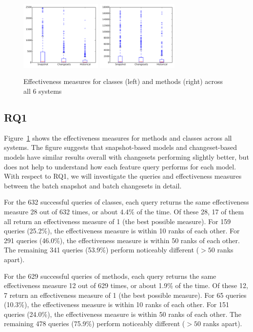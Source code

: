 \begin{figure}[t]
\centering
\includegraphics[width=0.36\textwidth]{figures/rq2-overall-class}
\includegraphics[width=0.36\textwidth]{figures/rq2-overall-method}
\caption{Effectiveness measures for classes (left) and methods (right) across all 6 systems}
\label{fig:em}
\end{figure}

\subsection{RQ1}

Figure~\ref{fig:em} shows the effectiveness measures for methods and classes
across all systems. The figure suggests that snapshot-based models and
changeset-based models have similar results overall with changesets performing
slightly better, but does not help to understand how each feature query performs
for each model.  With respect to RQ1, we will investigate the queries and
effectiveness measures between the batch snapshot and batch changesets in
detail.

For the 632 successful queries of classes, each query returns the same
effectiveness measure 28 out of 632 times, or about 4.4\% of the time.  Of these
28, 17 of them all return an effectiveness measure of 1 (the best possible
measure).  For 159 queries (25.2\%), the effectiveness measure is within 10
ranks of each other.  For 291 queries (46.0\%), the effectiveness measure is
within 50 ranks of each other.  The remaining 341 queries (53.9\%) perform
noticeably different ($> 50$ ranks apart).

For the 629 successful queries of methods, each query returns the same
effectiveness measure 12 out of 629 times, or about 1.9\% of the time.  Of these
12, 7 return an effectiveness measure of 1 (the best possible measure).  For 65
queries (10.3\%), the effectiveness measure is within 10 ranks of each other.
For 151 queries (24.0\%), the effectiveness measure is within 50 ranks of each
other.  The remaining 478 queries (75.9\%) perform noticeably different ($> 50$
ranks apart).


